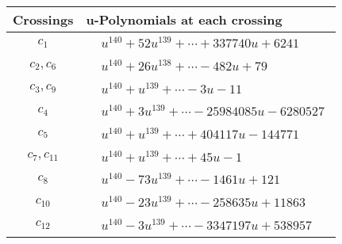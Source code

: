 \documentclass[1p]{elsarticle_modified}
\theoremstyle{definition}
\begin{document}
\begin{tabular}{m{50pt}|m{274pt}}
Crossings & \hspace{64pt}u-Polynomials at each crossing \\
\hline $$\begin{aligned}c_{1}\end{aligned}$$&$\begin{aligned}
&u^{140}+52 u^{139}+\cdots+337740 u+6241
\end{aligned}$\\
\hline $$\begin{aligned}c_{2},c_{6}\end{aligned}$$&$\begin{aligned}
&u^{140}+26 u^{138}+\cdots-482 u+79
\end{aligned}$\\
\hline $$\begin{aligned}c_{3},c_{9}\end{aligned}$$&$\begin{aligned}
&u^{140}+u^{139}+\cdots-3 u-11
\end{aligned}$\\
\hline $$\begin{aligned}c_{4}\end{aligned}$$&$\begin{aligned}
&u^{140}+3 u^{139}+\cdots-25984085 u-6280527
\end{aligned}$\\
\hline $$\begin{aligned}c_{5}\end{aligned}$$&$\begin{aligned}
&u^{140}+u^{139}+\cdots+404117 u-144771
\end{aligned}$\\
\hline $$\begin{aligned}c_{7},c_{11}\end{aligned}$$&$\begin{aligned}
&u^{140}+u^{139}+\cdots+45 u-1
\end{aligned}$\\
\hline $$\begin{aligned}c_{8}\end{aligned}$$&$\begin{aligned}
&u^{140}-73 u^{139}+\cdots-1461 u+121
\end{aligned}$\\
\hline $$\begin{aligned}c_{10}\end{aligned}$$&$\begin{aligned}
&u^{140}-23 u^{139}+\cdots-258635 u+11863
\end{aligned}$\\
\hline $$\begin{aligned}c_{12}\end{aligned}$$&$\begin{aligned}
&u^{140}-3 u^{139}+\cdots-3347197 u+538957
\end{aligned}$\\
\hline
\end{tabular}\\~\\
\end{document}
